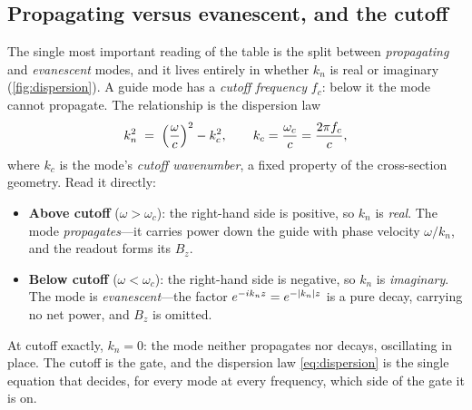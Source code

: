 \subsection{Propagating versus evanescent, and the cutoff}

The single most important reading of the table is the split between
\emph{propagating} and \emph{evanescent} modes, and it lives entirely in whether
$k_n$ is real or imaginary (\cref{fig:dispersion}). A guide mode has a
\emph{cutoff frequency} $f_c$: below it the mode cannot propagate. The relationship
is the dispersion law
\begin{equation}
  k_n^2 \;=\; \Bigl(\frac{\omega}{c}\Bigr)^2 - k_c^2,
  \qquad k_c = \frac{\omega_c}{c} = \frac{2\pi f_c}{c},
  \label{eq:dispersion}
\end{equation}
where $k_c$ is the mode's \emph{cutoff wavenumber}, a fixed property of the
cross-section geometry. Read it directly:
\begin{itemize}[nosep]
  \item \textbf{Above cutoff} ($\omega > \omega_c$): the right-hand side is
  positive, so $k_n$ is \emph{real}. The mode \emph{propagates}---it carries power
  down the guide with phase velocity $\omega/k_n$, and the readout forms its $B_z$.
  \item \textbf{Below cutoff} ($\omega < \omega_c$): the right-hand side is
  negative, so $k_n$ is \emph{imaginary}. The mode is \emph{evanescent}---the
  factor $e^{-ik_n z}=e^{-\lvert k_n\rvert z}$ is a pure decay, carrying no net power, and
  $B_z$ is omitted.
\end{itemize}
At cutoff exactly, $k_n=0$: the mode neither propagates nor decays, oscillating in
place. The cutoff is the gate, and the dispersion law \eqref{eq:dispersion} is the
single equation that decides, for every mode at every frequency, which side of the
gate it is on.

